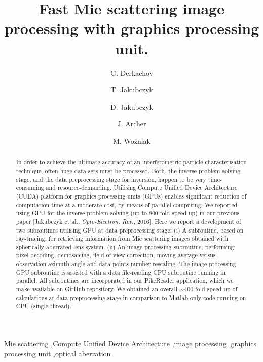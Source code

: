 \documentclass[preprint,review,12pt,dvips]{elsarticle}
\begin{document}
\begin{frontmatter}
\title{Fast Mie scattering image processing with graphics processing unit.}
\author[ifpan]{G. Derkachov}
\author[iccm]{T. Jakubczyk}
\author[ifpan]{D. Jakubczyk}
\author[ifpan]{J. Archer}
\author[ifpan]{M. {Wo\'{z}niak}}

\address[ifpan]{Institute of Physics, Polish Academy of Sciences,
Aleja~{Lotnik\'{o}w} 32/46, PL-02668 Warsaw, Poland}
\address[iccm]{Institute of Control and Computation Engineering, Warsaw University of Technology,
ul.~Nowowiejska 15/19, PL-00665 Warsaw, Poland} 

\begin{abstract}
        In order to achieve the ultimate accuracy of an interferometric particle characterisation technique, often huge data sets
    must be processed. Both, the inverse problem solving stage, and the data preprocessing stage for inversion, happen to be
    very time-consuming and resource-demanding. Utilising Compute Unified Device Architecture (CUDA) platform for graphics processing units
    (GPUs) enables significant reduction of computation time at a moderate cost, by means of parallel computing.
    We reported using GPU for the inverse problem solving (up to 800-fold speed-up) in our previous paper
    [Jakubczyk et al., \textit{Opto-Electron. Rev.}, 2016]. Here we report a development of two subroutines utilising GPU at data
    preprocessing stage: (i) A subroutine, based on ray-tracing, for retrieving information from Mie scattering images
    obtained with spherically aberrated lens system. (ii) An image processing subroutine, performing: pixel decoding,
    demosaicing, field-of-view correction, moving average versus observation azimuth angle and data points number rescaling.
    The image processing GPU subroutine is assisted with a data file-reading CPU subroutine running in parallel. All
    subroutines are incorporated in our PikeReader application, which we make available on GitHub repository. We obtained an
    overall $\sim 400$-fold speed-up of calculations at data preprocessing stage in comparison to Matlab-only code running on
    CPU (single thread).
\end{abstract}

\begin{keyword}
    Mie scattering \sep Compute Unified Device Architecture \sep image processing \sep graphics processing unit \sep optical
    aberration
\end{keyword}
\end{frontmatter}
\end{document}
